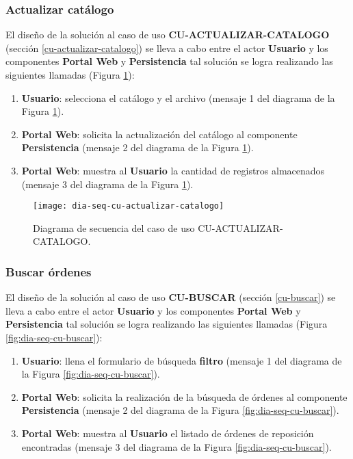 \pagebreak

\subsubsection{Actualizar catálogo}
El diseño de la solución al caso de uso \textbf{CU-ACTUALIZAR-CATALOGO} (sección \ref{cu-actualizar-catalogo}) se lleva a cabo entre el actor \textbf{Usuario} y los componentes \textbf{Portal Web} y \textbf{Persistencia} tal solución se logra realizando las siguientes llamadas (Figura \ref{fig:dia-seq-cu-actualizar-catalogo}):
\begin{enumerate}
	\item \textbf{Usuario}: selecciona el catálogo y el archivo (mensaje 1 del diagrama de la Figura \ref{fig:dia-seq-cu-actualizar-catalogo}).
	\item \textbf{Portal Web}: solicita la actualización del catálogo al componente \textbf{Persistencia} (mensaje 2 del diagrama de la Figura \ref{fig:dia-seq-cu-actualizar-catalogo}).
	\item \textbf{Portal Web}: muestra al \textbf{Usuario} la cantidad de registros almacenados (mensaje 3 del diagrama de la Figura \ref{fig:dia-seq-cu-actualizar-catalogo}).
\end{enumerate}

\begin{figure}[h]
	\centering
	\texttt{[image: dia-seq-cu-actualizar-catalogo]}
	\caption{Diagrama de secuencia del caso de uso CU-ACTUALIZAR-CATALOGO.}
	\label{fig:dia-seq-cu-actualizar-catalogo}
\end{figure}

\pagebreak

\subsubsection{Buscar órdenes}
El diseño de la solución al caso de uso \textbf{CU-BUSCAR} (sección \ref{cu-buscar}) se lleva a cabo entre el actor \textbf{Usuario} y los componentes \textbf{Portal Web} y \textbf{Persistencia} tal solución se logra realizando las siguientes llamadas (Figura \ref{fig:dia-seq-cu-buscar}):
\begin{enumerate}
	\item \textbf{Usuario}: llena el formulario de búsqueda \textbf{filtro} (mensaje 1 del diagrama de la Figura \ref{fig:dia-seq-cu-buscar}).
	\item \textbf{Portal Web}: solicita la realización de la búsqueda de órdenes al componente \textbf{Persistencia} (mensaje 2 del diagrama de la Figura \ref{fig:dia-seq-cu-buscar}).
	\item \textbf{Portal Web}: muestra al \textbf{Usuario} el listado de órdenes de reposición encontradas (mensaje 3 del diagrama de la Figura \ref{fig:dia-seq-cu-buscar}).
\end{enumerate}

